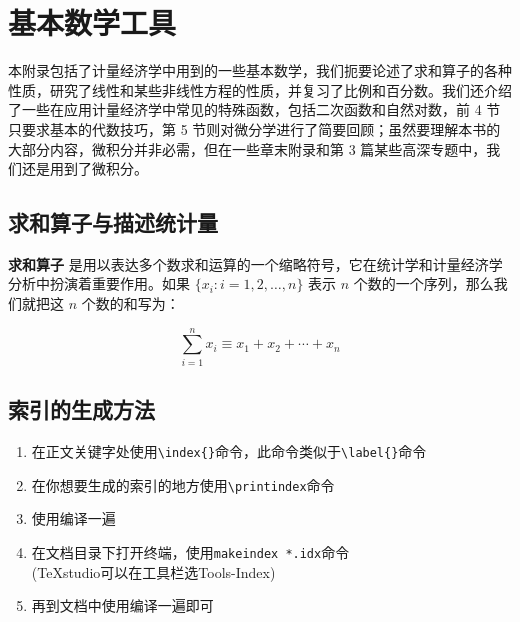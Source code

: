\chapter{基本数学工具}

本附录包括了计量经济学中用到的一些基本数学，我们扼要论述了求和算子的各种性质，研究了线性和某些非线性方程的性质，并复习了比例和百分数。我们还介绍了一些在应用计量经济学中常见的特殊函数，包括二次函数和自然对数，前 4 节只要求基本的代数技巧，第 5 节则对微分学进行了简要回顾；虽然要理解本书的大部分内容，微积分并非必需，但在一些章末附录和第 3 篇某些高深专题中，我们还是用到了微积分。

\section{求和算子与描述统计量}

\textbf{求和算子} 是用以表达多个数求和运算的一个缩略符号，它在统计学和计量经济学分析中扮演着重要作用。如果 $\{x_i: i=1, 2, \ldots, n\}$ 表示 $n$ 个数的一个序列，那么我们就把这 $n$ 个数的和写为：

\begin{equation}
\sum_{i=1}^n x_i \equiv x_1 + x_2 +\cdots + x_n
\end{equation}
\section{索引的生成方法}
\begin{enumerate}
	\item 在正文关键字处使用\lstinline|\index{}|命令，此命令类似于\lstinline|\label{}|命令
	\item 在你想要生成的索引的地方使用\lstinline|\printindex|命令
	\item 使用编译一遍
	\item 在文档目录下打开终端，使用\lstinline|makeindex *.idx|命令\\(TeXstudio可以在工具栏选Tools-Index)
	\item 再到文档中使用编译一遍即可
\end{enumerate}